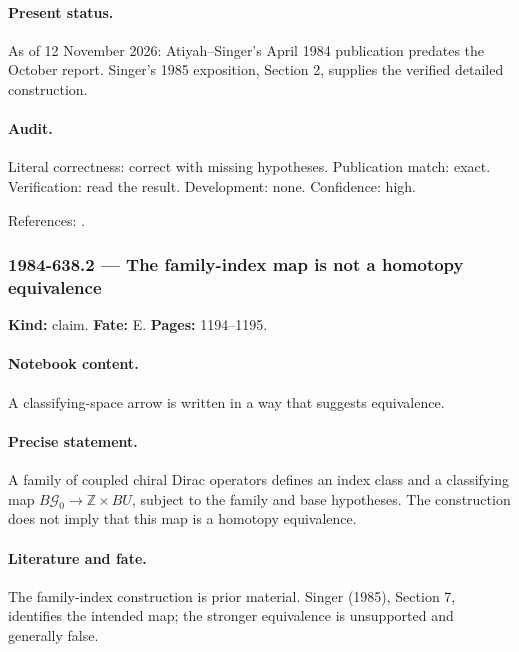 \paragraph{Present status.} As of 12 November 2026: Atiyah--Singer's April 1984 publication predates the October report. Singer's 1985 exposition, Section 2, supplies the verified detailed construction.

\paragraph{Audit.} Literal correctness: correct with missing hypotheses. Publication match: exact. Verification: read the result. Development: none. Confidence: high.

\noindent References: \citep{atiyahsinger1984dirac,singer1985families}.\par

\subsubsection{1984-638.2 --- The family-index map is not a homotopy equivalence}

\label{item:1984-638.2}

\noindent\textbf{Kind:} claim. \textbf{Fate:} E. \textbf{Pages:} 1194--1195.\par

\paragraph{Notebook content.} A classifying-space arrow is written in a way that suggests equivalence.

\paragraph{Precise statement.} A family of coupled chiral Dirac operators defines an index class and a classifying map \(B\mathcal G_0\to\mathbb Z\times BU\), subject to the family and base hypotheses. The construction does not imply that this map is a homotopy equivalence.

\paragraph{Literature and fate.} The family-index construction is prior material. Singer (1985), Section 7, identifies the intended map; the stronger equivalence is unsupported and generally false.


